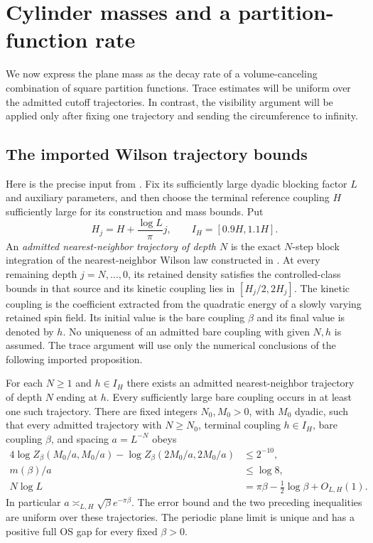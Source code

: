 \section{Cylinder masses and a partition-function rate}
\label{sec:cylinders}

We now express the plane mass as the decay rate of a
volume-canceling combination of square partition functions.
Trace estimates will be uniform over the admitted cutoff
trajectories. In contrast, the visibility argument will be
applied only after fixing one trajectory and sending the
circumference to infinity.

\subsection{The imported Wilson trajectory bounds}

Here is the precise input from \cite{SharpO4}. Fix its
sufficiently large dyadic blocking factor $L$ and auxiliary
parameters, and then choose the terminal reference coupling
$H$ sufficiently large for its construction and mass bounds. Put
\[
 H_j=H+\frac{\log L}{\pi}j,\qquad I_H=[0.9H,1.1H].
\]
An \emph{admitted nearest-neighbor trajectory of depth $N$}
is the exact $N$-step block integration of the nearest-neighbor
Wilson law constructed in \cite[Sections~5.1 and~7.1]{SharpO4}.
At every remaining depth $j=N,\ldots,0$, its retained density
satisfies the controlled-class bounds in that source and its
kinetic coupling lies in $[H_j/2,2H_j]$. The kinetic coupling
is the coefficient extracted from the quadratic energy of a
slowly varying retained spin field. Its initial value is the
bare coupling $\beta$ and its final value is denoted by $h$.
No uniqueness of an admitted bare coupling with given $N,h$
is assumed. The trace argument will use only the numerical
conclusions of the following imported proposition.

\begin{proposition}
\label{prop:wilson-input}
For each $N\ge1$ and $h\in I_H$ there exists an admitted
nearest-neighbor trajectory of depth $N$ ending at $h$.
Every sufficiently large bare coupling occurs in at least
one such trajectory. There are fixed integers $N_0,M_0>0$,
with $M_0$ dyadic, such that every admitted trajectory with
$N\ge N_0$, terminal coupling $h\in I_H$, bare coupling
$\beta$, and spacing $a=L^{-N}$ obeys
\begin{align}
 4\log Z_\beta(M_0/a,M_0/a)
 -\log Z_\beta(2M_0/a,2M_0/a)&\le2^{-10},
 \label{eq:wilson-seed}\\
 m(\beta)/a&\le\log8,
 \label{eq:wilson-input-upper}\\
 N\log L&=\pi\beta-\tfrac12\log\beta+O_{L,H}(1).
 \label{eq:wilson-calibration}
\end{align}
In particular $a\asymp_{L,H}\sqrt\beta e^{-\pi\beta}$.
The error bound and the two preceding inequalities are uniform
over these trajectories. The periodic plane limit is unique
and has a positive full OS gap for every fixed $\beta>0$.
\end{proposition}

